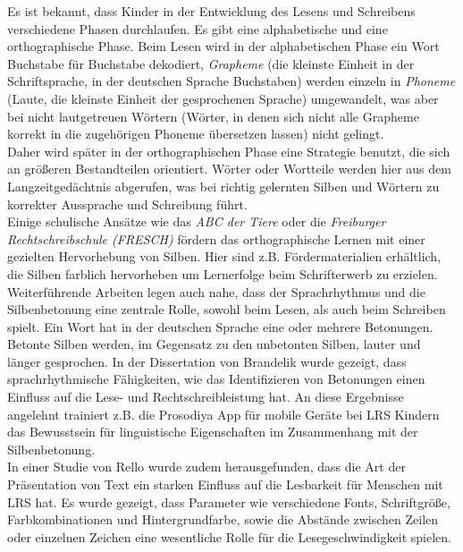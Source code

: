 Es ist bekannt, dass Kinder in der Entwicklung des Lesens und Schreibens verschiedene Phasen durchlaufen\cite{Steinbrink2014}. Es gibt eine alphabetische und eine orthographische Phase. Beim Lesen wird in der alphabetischen Phase ein Wort Buchstabe für Buchstabe dekodiert, \textit{Grapheme} (die kleinste Einheit in der Schriftsprache, in der deutschen Sprache Buchstaben) werden einzeln in \textit{Phoneme} (Laute, die kleinste Einheit der gesprochenen Sprache) umgewandelt, was aber bei nicht lautgetreuen Wörtern (Wörter, in denen sich nicht alle Grapheme korrekt in die zugehörigen Phoneme übersetzen lassen) nicht gelingt.\\
Daher wird später in der orthographischen Phase eine Strategie benutzt, die sich an größeren Bestandteilen orientiert. Wörter oder Wortteile werden hier aus dem Langzeitgedächtnis abgerufen, was bei richtig gelernten Silben und Wörtern zu korrekter Aussprache und Schreibung führt.\\
Einige schulische Ansätze wie das \textit{ABC der Tiere}\cite{mildenberger2013} oder die \textit{Freiburger Rechtschreibschule (FRESCH)}\cite{Fresch2016} fördern das orthographische Lernen mit einer gezielten Hervorhebung von Silben. Hier sind z.B. Fördermaterialien erhältlich, die Silben farblich hervorheben um Lernerfolge beim Schrifterwerb zu erzielen.\\

Weiterführende Arbeiten legen auch nahe, dass der Sprachrhythmus und die Silbenbetonung eine zentrale Rolle, sowohl beim Lesen, als auch beim Schreiben spielt. Ein Wort hat in der deutschen Sprache eine oder mehrere Betonungen. Betonte Silben werden, im Gegensatz zu den unbetonten Silben, lauter und länger gesprochen. In der Dissertation von Brandelik\cite{Brandelik2014} wurde gezeigt, dass sprachrhythmische Fähigkeiten, wie das Identifizieren von Betonungen einen Einfluss auf die Lese- und Rechtschreibleistung hat. An diese Ergebnisse angelehnt trainiert z.B. die Prosodiya App\cite{Holz2017d} für mobile Geräte bei LRS Kindern das Bewusstsein für linguistische Eigenschaften im Zusammenhang mit der Silbenbetonung.\\
In einer Studie von Rello\cite{Rello:2017:PMR:3057333.3057414} wurde zudem herausgefunden, dass die Art der Präsentation von Text ein starken Einfluss auf die Lesbarkeit für Menschen mit LRS hat. Es wurde gezeigt, dass Parameter wie verschiedene Fonts, Schriftgröße, Farbkombinationen und Hintergrundfarbe, sowie die Abstände zwischen Zeilen oder einzelnen Zeichen eine wesentliche Rolle für die Lesegeschwindigkeit spielen.

